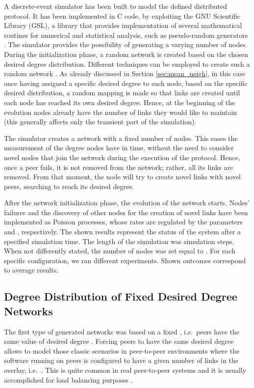 \documentclass[a4paper,twosided]{article}
\begin{document}
A discrete-event simulator has been built to model the defined distributed protocol. It has been implemented in C code, by exploiting the GNU Scientific Library (GSL), a library that provides implementation of several mathematical routines for numerical and statistical analysis, such as pseudo-random generators \cite{gsl}. The simulator provides the possibility of generating a varying number of nodes. During the initialization phase, a random network is created based on the chosen desired degree distribution. Different techniques can be employed to create such a random network \cite{newmanHandbook,simutools,BenderC78}. As already discussed in Section \ref{sec:mean_neigh}, in this case once having assigned a specific desired degree to each node, based on the specific desired distribution, a random mapping is made so that links are created until each node has reached its own desired degree.
Hence, at the beginning of the evolution nodes already have the number of links they would like to maintain (this generally affects only the transient part of the simulation).

The simulator creates a network with a fixed number of nodes. This eases the measurement of the degree nodes have in time, without the need to consider novel nodes that join the network during the execution of the protocol. Hence, once a peer fails, it is not removed from the network; rather, all its links are removed. From that moment, the node will try to create novel links with novel peers, searching to reach its desired degree.

After the network initialization phase, the evolution of the network starts. Nodes' failures and the discovery of other nodes for the creation of novel links have been implemented as Poisson processes, whose rates are regulated by the parameters  and , respectively. 
The shown results represent the status of the system after a specified simulation time. The length of the simulation was  simulation steps. When not differently stated, the number of nodes was set equal to . For each specific configuration, we ran  different experiments. Shown outcomes correspond to average results.

\subsection{Degree Distribution of Fixed Desired Degree Networks}

The first type of generated networks was based on a fixed , i.e.~peers have the same value of desired degree . Forcing peers to have the same desired degree  allows to model those classic scenarios in peer-to-peer environments where the software running on peers is configured to have a given number of links in the overlay, i.e.~. This is quite common in real peer-to-peer systems and it is usually accomplished for load balancing purposes \cite{wang}.
\end{document}
